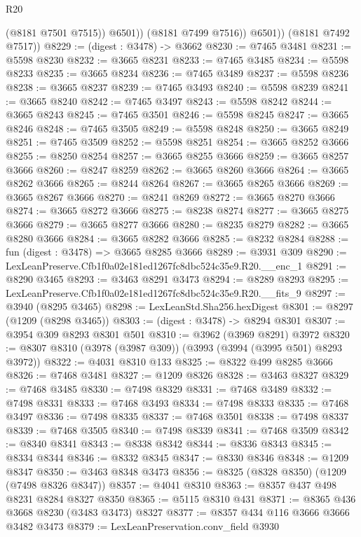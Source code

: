 \begin{lexlean}{R20}
\begin{coremodule}
                  (@8181 @7501 @7515))
                @6501))
            (@8181 @7499 @7516))
          @6501))
      (@8181 @7492 @7517))
@8229 := (digest : @3478) -> @3662
@8230 := @7465 @3481
@8231 := @5598 @8230
@8232 := @3665 @8231
@8233 := @7465 @3485
@8234 := @5598 @8233
@8235 := @3665 @8234
@8236 := @7465 @3489
@8237 := @5598 @8236
@8238 := @3665 @8237
@8239 := @7465 @3493
@8240 := @5598 @8239
@8241 := @3665 @8240
@8242 := @7465 @3497
@8243 := @5598 @8242
@8244 := @3665 @8243
@8245 := @7465 @3501
@8246 := @5598 @8245
@8247 := @3665 @8246
@8248 := @7465 @3505
@8249 := @5598 @8248
@8250 := @3665 @8249
@8251 := @7465 @3509
@8252 := @5598 @8251
@8254 := @3665 @8252 @3666
@8255 := @8250 @8254
@8257 := @3665 @8255 @3666
@8259 := @3665 @8257 @3666
@8260 := @8247 @8259
@8262 := @3665 @8260 @3666
@8264 := @3665 @8262 @3666
@8265 := @8244 @8264
@8267 := @3665 @8265 @3666
@8269 := @3665 @8267 @3666
@8270 := @8241 @8269
@8272 := @3665 @8270 @3666
@8274 := @3665 @8272 @3666
@8275 := @8238 @8274
@8277 := @3665 @8275 @3666
@8279 := @3665 @8277 @3666
@8280 := @8235 @8279
@8282 := @3665 @8280 @3666
@8284 := @3665 @8282 @3666
@8285 := @8232 @8284
@8288 := fun (digest : @3478) => @3665 @8285 @3666
@8289 := @3931 @309
@8290 := LexLeanPreserve.Cfb1f0a02e181ed1267fc8dbc524c35e9.R20.__enc_1
@8291 := @8290 @3465
@8293 := @3463 @8291 @3473
@8294 := @8289 @8293
@8295 := LexLeanPreserve.Cfb1f0a02e181ed1267fc8dbc524c35e9.R20.__fits_9
@8297 := @3940 (@8295 @3465)
@8298 := LexLeanStd.Sha256.hexDigest
@8301 := @8297 (@1209 (@8298 @3465))
@8303 := (digest : @3478) -> @8294 @8301
@8307 := @3954 @309 @8293 @8301 @501
@8310 := @3962 (@3969 @8291) @3972
@8320 := @8307 @8310 (@3978 (@3987 @309)) (@3993 (@3994 (@3995 @501) @8293 @3972))
@8322 := @4031 @8310 @133
@8325 := @8322 @499 @8285 @3666
@8326 := @7468 @3481
@8327 := @1209 @8326
@8328 := @3463 @8327
@8329 := @7468 @3485
@8330 := @7498 @8329
@8331 := @7468 @3489
@8332 := @7498 @8331
@8333 := @7468 @3493
@8334 := @7498 @8333
@8335 := @7468 @3497
@8336 := @7498 @8335
@8337 := @7468 @3501
@8338 := @7498 @8337
@8339 := @7468 @3505
@8340 := @7498 @8339
@8341 := @7468 @3509
@8342 := @8340 @8341
@8343 := @8338 @8342
@8344 := @8336 @8343
@8345 := @8334 @8344
@8346 := @8332 @8345
@8347 := @8330 @8346
@8348 := @1209 @8347
@8350 := @3463 @8348 @3473
@8356 := @8325 (@8328 @8350) (@1209 (@7498 @8326 @8347))
@8357 := @4041 @8310
@8363 := @8357 @437 @498 @8231 @8284 @8327 @8350
@8365 := @5115 @8310 @431
@8371 := @8365 @436 @3668 @8230 (@3483 @3473) @8327
@8377 := @8357 @434 @116 @3666 @3666 @3482 @3473
@8379 := LexLeanPreservation.conv_field @3930

\end{coremodule}
\end{lexlean}
